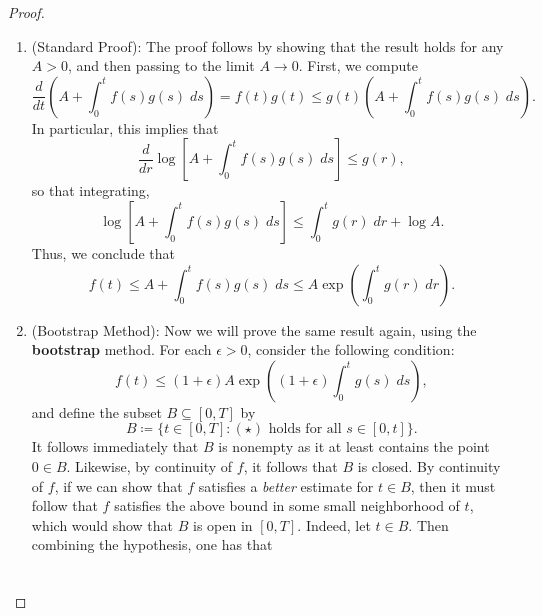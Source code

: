 \documentclass{article}
\numberwithin{equation}{section}
\begin{document}
	\begin{proof}
		$ $\newline \vspace{-0.65cm}
		\begin{enumerate}[itemsep =-2pt,label = (\arabic{*})]
			\item (Standard Proof): The proof follows by showing that the result holds for any $A > 0$, and then passing to the limit $A \to 0$. First, we compute 
			\begin{equation*}
				\frac{d}{dt}\left(A + \int_{0}^{t}f(s)g(s)\;ds\right) = f(t)g(t) \leq g(t)\left(A + \int_{0}^{t}f(s)g(s)\;ds\right). 
			\end{equation*}
			In particular, this implies that 
			\begin{equation*}
				\frac{d}{dr}\log\left[A + \int_{0}^{t}f(s)g(s)\;ds\right] \leq g(r), 
			\end{equation*}
			so that integrating, 
			\begin{equation*}
				\log\left[A + \int_{0}^{t}f(s)g(s)\;ds\right] \leq \int_{0}^{t}g(r)\;dr + \log{A}. 
			\end{equation*}
			Thus, we conclude that 
			\begin{equation*}
				f(t) \leq A + \int_{0}^{t}f(s)g(s)\;ds \leq A\exp\left(\int_{0}^{t}g(r)\;dr\right). 
			\end{equation*}
			\item (Bootstrap Method): Now we will prove the same result again, using the \textbf{bootstrap} method. For each $\epsilon > 0$, consider the following condition: 
			\begin{equation*}
				f(t) \leq (1 + \epsilon)A\exp\left((1 + \epsilon)\int_{0}^{t}g(s)\;ds\right), 
				\tag{$\star$}
			\end{equation*}
			and define the subset $B \subseteq [0,T]$ by 
			\begin{equation*}
				B \coloneqq \{t \in [0,T]: (\star) \text{ holds for all $s \in [0,t]$}\}. 
			\end{equation*}
			It follows immediately that $B$ is nonempty as it at least contains the point $0 \in B$. Likewise, by continuity of $f$, it follows that $B$ is closed. By continuity of $f$, if we can show that $f$ satisfies a \textit{better} estimate for $t \in B$, then it must follow that $f$ satisfies the above bound in some small neighborhood of $t$, which would show that $B$ is open in $[0,T]$. Indeed, let $t \in B$. Then combining the hypothesis, one has that 
			\begin{align*}
				\begin{split}

\end{split}
\end{align*}
\end{enumerate}
\end{proof}
\end{document}
